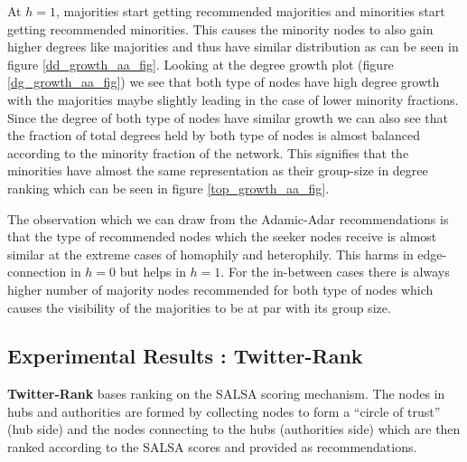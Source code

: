 At $h=1$, majorities start getting recommended majorities and minorities start getting recommended minorities. This causes the minority nodes to also gain higher degrees like majorities and thus have similar distribution as can be seen in figure \ref{dd_growth_aa_fig}. Looking at the degree growth plot (figure \ref{dg_growth_aa_fig}) we see that both type of nodes have high degree growth with the majorities maybe slightly leading in the case of lower minority fractions. Since the degree of both type of nodes have similar growth we can also see that the fraction of total degrees held by both type of nodes is almost balanced according to the minority fraction of the network. This signifies that the minorities have almost the same representation as their group-size in degree ranking which can be seen in figure \ref{top_growth_aa_fig}.

The observation which we can draw from the Adamic-Adar recommendations is that the type of recommended nodes which the seeker nodes receive is almost similar at the extreme cases of homophily and heterophily. This harms in edge-connection in $h=0$ but helps in $h=1$. For the in-between cases there is always higher number of majority nodes recommended for both type of nodes which causes the visibility of the majorities to be at par with its group size.

\subsection{Experimental Results : Twitter-Rank}

\textbf{Twitter-Rank} bases ranking on the SALSA scoring mechanism. The nodes in hubs and authorities are formed by collecting nodes to form a ``circle of trust'' (hub side) and the nodes connecting  to the hubs (authorities side) which are then ranked according to the SALSA scores and provided as recommendations.

